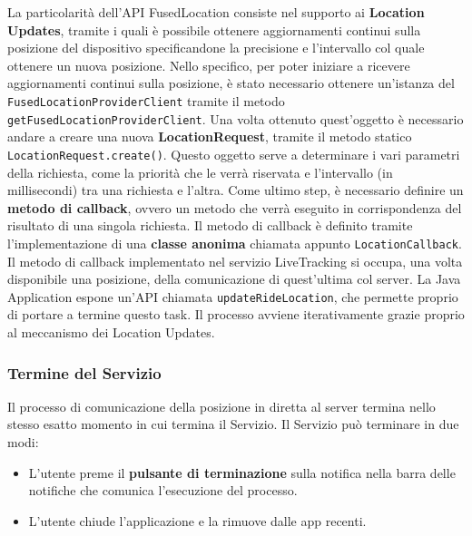                         La particolarità dell'API FusedLocation consiste nel supporto ai \textbf{Location Updates}, tramite i quali è possibile ottenere aggiornamenti continui sulla posizione del dispositivo specificandone la precisione e l'intervallo col quale ottenere un nuova posizione.
                        Nello specifico, per poter iniziare a ricevere aggiornamenti continui sulla posizione, è stato necessario ottenere un'istanza del \texttt{FusedLocationProviderClient} tramite il metodo 
                        \texttt{getFusedLocationProviderClient}.
                        Una volta ottenuto quest'oggetto è necessario andare a creare una nuova \textbf{LocationRequest}, tramite il metodo statico \texttt{LocationRequest.create()}. Questo oggetto serve a determinare i vari parametri della richiesta, come la priorità che le verrà riservata e l'intervallo (in millisecondi) tra una richiesta e l'altra.
                        Come ultimo step, è necessario definire un \textbf{metodo di callback}, ovvero un metodo che verrà eseguito in corrispondenza del risultato di una singola richiesta. Il metodo di callback è definito tramite l'implementazione di una \textbf{classe anonima} chiamata appunto \texttt{LocationCallback}.\\
                        Il metodo di callback implementato nel servizio LiveTracking si occupa, una volta disponibile una posizione, della comunicazione di quest'ultima col server. 
                        La Java Application espone un'API chiamata \texttt{updateRideLocation}, che permette proprio di portare a termine questo task.
                        Il processo avviene iterativamente grazie proprio al meccanismo dei Location Updates. 
                        
                        
                        \subsubsection{Termine del Servizio}
                            Il processo di comunicazione della posizione in diretta al server termina nello stesso esatto momento in cui termina il Servizio.
                            Il Servizio può terminare in due modi:

                            \begin{itemize}
                                \item L'utente preme il \textbf{pulsante di terminazione} sulla notifica nella barra delle notifiche che comunica l'esecuzione del processo.
                                \item L'utente chiude l'applicazione e la rimuove dalle app recenti.
                            \end{itemize}

